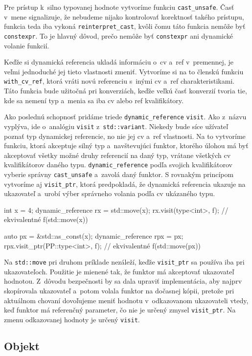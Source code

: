 Pre prístup k~silno typovanej hodnote vytvoríme funkciu \texttt{cast\_unsafe}. Časť  v~mene signalizuje, že nebudeme nijako kontrolovať korektnosť takého prístupu, funkcia teda iba vykoná \texttt{reinterpret\_cast}, kvôli čomu táto funkcia nemôže byť \texttt{constexpr}. To je hlavný dôvod, prečo nemôže byť \texttt{constexpr} ani dynamické volanie funkcií.

Keďže si dynamická referencia ukladá informáciu o~cv a~ref v~premennej, je veľmi jednoduché jej tieto vlastnosti zmeniť. Vytvoríme si na to členskú funkciu \texttt{with\_cv\_ref}, ktorá vráti novú referenciu s~inými cv a~ref charakteristikami. Táto funkcia bude užitočná pri konverziách, keďže veľkú časť konverzií tvoria tie, kde sa nemení typ a~menia sa iba cv alebo ref kvalifikátory.

Ako poslednú schopnosť pridáme triede \texttt{dynamic\_reference} \texttt{visit}. Ako z~ná\-zvu vyplýva, ide o~analógiu \texttt{visit} z~\texttt{std::variant}. Niekedy bude síce užívateľ poznať typ dynamickej referencie, no nie jej cv a~ref vlastnosti. Na to vytvoríme funkciu, ktorá akceptuje silný typ a~navštevujúci funktor, ktorého úlohou má byť akceptovať všetky možné druhy referencií na daný typ, vrátane všetkých cv kvalifikátorov daného typu. \texttt{dynamic\_reference} podľa svojich kvalifikátorov vyberie správny \texttt{cast\_unsafe} a~zavolá daný funktor. S rovnakým princípom vytvoríme aj \texttt{visit\_ptr}, ktorá predpokladá, že dynamická referencia ukazuje na ukazovateľ a~urobí výber správneho volania podľa cv ukázaného typu.
\begin{code}
int x = 4;
dynamic_reference rx = std::move(x);
rx.visit(type<int>, f); // ekvivalentné f(std::move(x))

auto px = &std::as_const(x);
dynamic_reference rpx = px;
rpx.visit_ptr(PP::type<int>, f); // ekvivalentné f(std::move(px))
\end{code}
Na \texttt{std::move} pri druhom príklade nezáleží, keďže \texttt{visit\_ptr} sa používa iba pri ukazovateľoch. Použitie je mienené tak, že funktor má akceptovať ukazovateľ hodnotou. Z~dôvodu bezpečnosti by sa dala upraviť implementácia, aby najprv skopírovala ukazovateľ a~potom volala funktor na dočasnej kópii, pretože pri aktuálnom chovaní dovoľujeme meniť hodnotu v~odkazovanom ukazovateli vtedy, keď funktor má referenčný parameter, čo nie je určený zmysel \texttt{visit\_ptr}. Na zmenu odkazovanej hodnoty je určený \texttt{visit}.

\subsection{Objekt}

